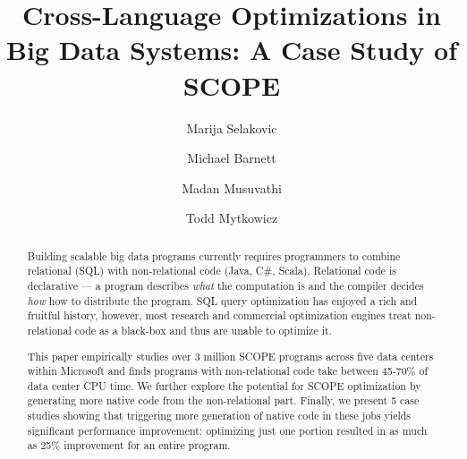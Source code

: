 \documentclass[sigconf, anonymous]{acmart}
\begin{document}
\title{Cross-Language Optimizations in Big Data Systems: A Case Study of SCOPE}


\author{Marija Selakovic}


\author{Michael Barnett}


\author{Madan Musuvathi}


  



\author{Todd Mytkowicz}


  


\renewcommand{\shortauthors}{M. Selakovic et al.}


\begin{abstract}

  Building scalable big data programs currently requires programmers to combine relational (SQL) with non-relational code (Java, C\#, Scala).
  Relational code is declarative --- a program describes \emph{what} the computation is and the compiler decides \emph{how} how to distribute the program.  SQL query optimization has enjoyed a rich and fruitful history, however, most research and commercial optimization engines treat non-relational code as a black-box and thus are unable to optimize it.

  This paper empirically studies over 3 million SCOPE programs across five data centers within Microsoft and finds programs with non-relational code take between 45-70\% of data center CPU time.
  We further explore the potential for SCOPE optimization by generating more native code from the non-relational part. Finally, we present 5 case studies showing that triggering more generation of native code in these jobs yields significant performance improvement: optimizing just one portion resulted in as much as 25\% improvement for an entire program.

\end{abstract}
\end{document}
